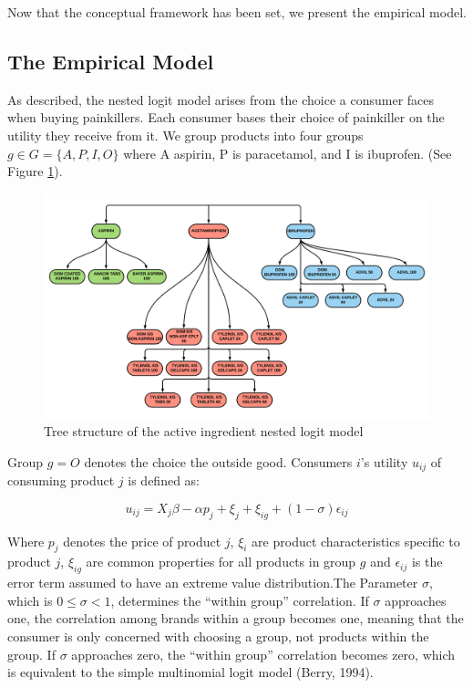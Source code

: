 \documentclass[12pt, authoryear]{elsarticle}
\begin{document}
Now that the conceptual framework has been set, we present the empirical model.

\subsection{The Empirical Model} 
As described, the nested logit model arises from the choice a consumer faces when buying painkillers. Each consumer bases their choice of painkiller on the utility they receive from it. We group products into four groups $g \in G = \{ A, P, I, O \}$ where A aspirin, P is paracetamol, and I is ibuprofen.  (See Figure \ref{tree1}). 

\begin{figure}[H]
	\centering
	\includegraphics[clip, angle=0, width=1\textwidth]{FIG1.pdf}
	\caption{Tree structure of the active ingredient nested logit model}\label{tree1}
\end{figure}

Group $g = O$ denotes the choice the outside good. Consumers $i$'s utility $u_{ij}$ of consuming product $j$ is defined as: 

\begin{equation}
u_{ij} = X_j \beta - \alpha p_j + \xi _{j} + \xi _ {ig} + (1- \sigma)\epsilon_{ij}
\end{equation} 

Where $p_j$ denotes the price of product $j$, $\xi_{i}$ are product characteristics specific to product $j$, $\xi_{ig}$ are common properties for all products in group $g$ and $\epsilon_{ij}$ is the error term assumed to have an extreme value distribution.The Parameter $\sigma$, which
is $0 \leq \sigma < 1$, determines the ``within group'' correlation. If $\sigma$ approaches one, the correlation
among brands within a group becomes one, meaning that the consumer is only concerned with choosing a group, not products within the group. If $\sigma$ approaches zero, the ``within group'' correlation becomes zero, which is equivalent to the simple multinomial logit model (Berry, 1994). 
\end{document}
